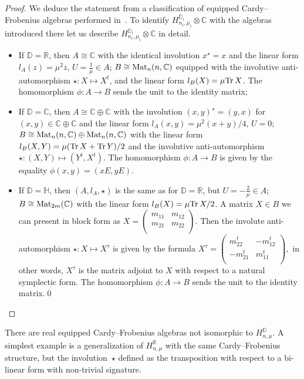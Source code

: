 \documentclass[pdftex]{sigma}
\newcommand{\tr}{\mathop{\sf tr}\nolimits}
\def \R {{\mathbb R}}
\def \C {{\mathbb C}}
\def \H {{\mathbb H}}
\def \tr {{\rm Tr}\,}
\def \mat {{\rm Mat}}
\begin{document}
\begin{proof}
We deduce the statement from a classif\/ication
of  equipped Cardy--Frobenius algebras performed in~\cite{AN}.
To identify $H^{\mathbb{D}_i}_{n_i,\mu_i} \otimes \C$ with the algebras
introduced there
let us describe  $H^{\mathbb{D}_i}_{n_i,\mu_i} \otimes \C$  in detail.
\begin{itemize}\itemsep=0pt
\item If $\mathbb{D}=\R$, then $A \cong \mathbb{C}$  with the identical
involution $x^\star = x$ and the linear form $l_{A} (z)=\mu^2 z$,
$U=\frac{1}{\mu}\in A$;
$B \cong \mat_n(n,\C)$ equipped with
the involutive anti-automorphism $\star: X\mapsto X^t$,
and the linear form $l_{B} (X)=\mu \tr X$.
The homomorphism $\phi:A\to B$ sends the unit to
the identity matrix;
\item If $\mathbb{D} = \C$, then $A \cong \mathbb{C}\oplus\mathbb{C}$ with the
involution $(x,y)^\star=(y,x)$ for $(x,y)\in \mathbb{C}\oplus\mathbb{C}$
and the linear form  $l_A(x,y)=\mu^2 (x+y)/4$,  $U=0$;
$B \cong \mat_n(n,\C) \oplus\mat_n(n,\C)$ with the linear
form $l_B(X,Y)=\mu (\tr X + \tr Y)/2$ and the involutive anti-automorphism
$\star: (X,Y)\mapsto (Y^t,X^t)$.
The  homomorphism $\phi:A\to B$ is given by the equality
$\phi(x,y)=(xE,yE)$.
\item If $\mathbb{D}=\H$, then $(A,l_A,\star)$
is the same as for $\mathbb{D}=\R$, but
$U=-\frac{2}{\mu}\in A$; $B\cong \mat_{2m}(\C)$
with the linear form $l_B(X)=\mu \tr X/2$. A matrix $X\in B$ we
can present in block form as $X=
\left(%
\begin{array}{cc}
  m_{11}&  m_{12}
   \\
  m_{21}& m_{22} \\
\end{array}%
\right)$.
Then the involute anti-automorphism $\star: X\mapsto X^\tau$
is given by the formula
 $X^\tau=
\left(%
\begin{array}{cc}
  m_{22}^t & -m_{12}^t
   \\
 -m_{21}^t & m_{11}^t \\
\end{array}%
\right),$
in other words,  $X^\tau$ is the matrix adjoint to $X$ with respect
to a natural symplectic form.
The homomorphism $\phi:A\to B$ sends the unit to
the identity matrix.\hfill \qed
\end{itemize}\renewcommand{\qed}{}
\end{proof}


\begin{note}
There are real equipped Cardy--Frobenius algebras not isomorphic to
$H^{\mathbb{D}}_{n,\mu}$. A simplest example is a generalization of
$H^{\mathbb{R}}_{n,\mu}$ with the same Cardy--Frobenius structure,
but the involu\-tion~$\star$ def\/ined as the transposition with respect to
a bi-linear form with non-trivial signature.
\end{note}
\end{document}
